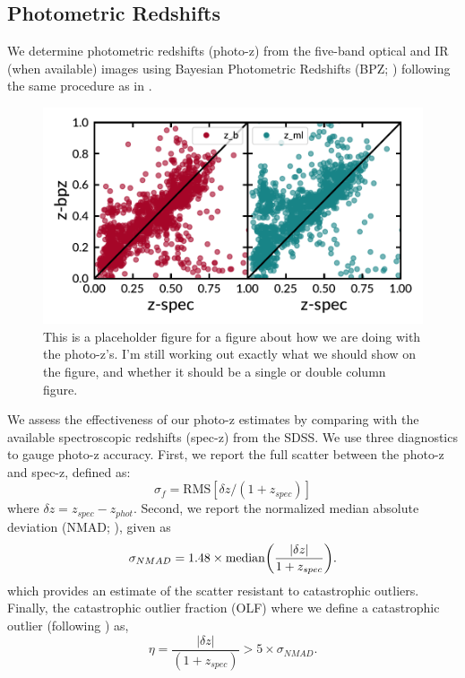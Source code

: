 \documentclass[apj, revtex4]{emulateapj}
\begin{document}
\subsection{Photometric Redshifts}
We determine photometric redshifts (photo-z) from the five-band optical and IR (when available) images using Bayesian Photometric Redshifts (BPZ; \citealt{Benitez2000, Coe2006}) following the same procedure as in \cite{Menanteau2008a}.

\begin{figure} 
	\includegraphics[width=\textwidth]{figures/specVSphot.pdf} 
	\caption{This is a placeholder figure for a figure about how we are doing with the photo-z's. I'm still working out exactly what we should show on the figure, and whether it should be a single or double column figure.} 
	\label{fig:icd_vs_mass} 
\end{figure}

We assess the effectiveness of our photo-z estimates by comparing with the available spectroscopic redshifts (spec-z) from the SDSS. We use three diagnostics to gauge photo-z accuracy. First, we report the full scatter between the photo-z and spec-z, defined as:
\begin{equation}
	\sigma_f = \mathrm{RMS}[\delta z/(1+z_{spec})]
\end{equation}
where $\delta z = z_{spec} - z_{phot}$. Second, we report the normalized median absolute deviation (NMAD; \citealt{Ilbert2009, Dahlen2013, Molino2017}), given as
\begin{equation}
	\sigma_{NMAD} = 1.48 \times \mathrm{median} \bigg{(} \frac{|\delta z|}{1+z_{spec}} \bigg{)}.
\end{equation}   
which provides an estimate of the scatter resistant to catastrophic outliers. Finally, the catastrophic outlier fraction (OLF) where we define a catastrophic outlier (following \citealt{Molino2017}) as,
\begin{equation}
	\eta = \frac{|\delta z|}{(1+z_{spec})} > 5 \times \sigma_{NMAD}.
\end{equation}
\end{document}
